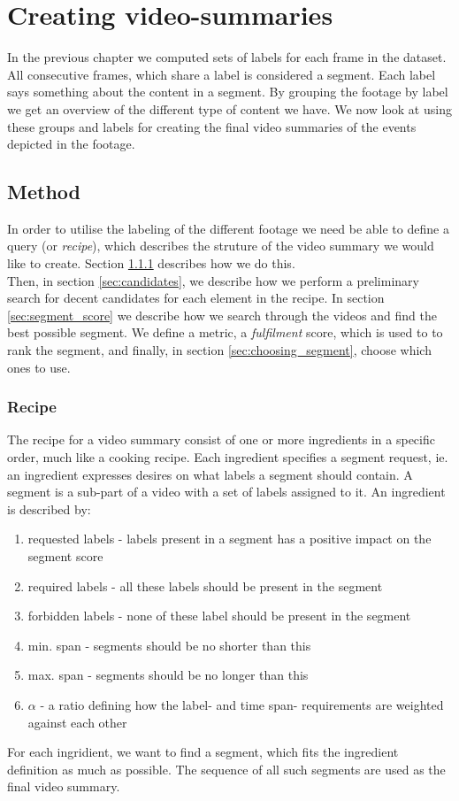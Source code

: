 %
\chapter{Creating video-summaries}\label{chp:video_summaries}
%
In the previous chapter we computed sets of labels for each frame in the dataset. All consecutive frames, which share a label is considered a segment. Each label says something about the content in a segment. By grouping the footage by label we get an overview of the different type of content we have. We now look at using these groups and labels for creating the final video summaries of the events depicted in the footage. 
%
\section{Method}
%
In order to utilise the labeling of the different footage we need be able to define a query (or \textit{recipe}), which describes the struture of the video summary we would like to create. Section \ref{sec:recipe} describes how we do this.\\
Then, in section \ref{sec:candidates}, we describe how we perform a preliminary search for decent candidates for each element in the recipe. In section \ref{sec:segment_score} we describe how we search through the videos and find the best possible segment. We define a metric, a \textit{fulfilment} score, which is used to to rank the segment, and finally, in section \ref{sec:choosing_segment}, choose which ones to use.
%
\subsection{Recipe}\label{sec:recipe}
%
The recipe for a video summary consist of one or more ingredients in a specific order, much like a cooking recipe. Each ingredient specifies a segment request, ie. an ingredient expresses desires on what labels a segment should contain. A segment is a sub-part of a video with a set of labels assigned to it. An ingredient is described by:
%
\begin{enumerate}
	\item requested labels - labels present in a segment has a positive impact on the segment score
	\item required labels - all these labels should be present in the segment
	\item forbidden labels - none of these label should be present in the segment
	\item min. span - segments should be no shorter than this
	\item max. span - segments should be no longer than this
	\item $\alpha$  - a ratio defining how the label- and time span- requirements are weighted against each other
\end{enumerate}
%
For each ingridient, we want to find a segment, which fits the ingredient definition as much as possible. The sequence of all such segments are used as the final video summary.
%
